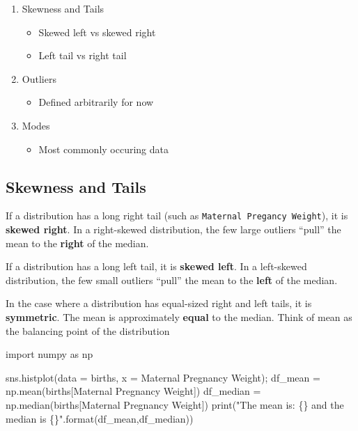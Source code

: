 \documentclass[
  letterpaper,
  DIV=11,
  numbers=noendperiod]{scrreprt}
\newenvironment{Shaded}{\begin{snugshade}}{\end{snugshade}}
\newcommand{\BuiltInTok}[1]{\textcolor[rgb]{0.00,0.23,0.31}{#1}}
\newcommand{\ImportTok}[1]{\textcolor[rgb]{0.00,0.46,0.62}{#1}}
\newcommand{\NormalTok}[1]{\textcolor[rgb]{0.00,0.23,0.31}{#1}}
\newcommand{\OperatorTok}[1]{\textcolor[rgb]{0.37,0.37,0.37}{#1}}
\newcommand{\SpecialCharTok}[1]{\textcolor[rgb]{0.37,0.37,0.37}{#1}}
\newcommand{\StringTok}[1]{\textcolor[rgb]{0.13,0.47,0.30}{#1}}
\providecommand{\tightlist}{%
  \setlength{\itemsep}{0pt}\setlength{\parskip}{0pt}}\usepackage{longtable,booktabs,array}
\begin{document}
\begin{enumerate}
\def\labelenumi{\arabic{enumi}.}
\tightlist
\item
  Skewness and Tails

  \begin{itemize}
  \tightlist
  \item
    Skewed left vs skewed right
  \item
    Left tail vs right tail
  \end{itemize}
\item
  Outliers

  \begin{itemize}
  \tightlist
  \item
    Defined arbitrarily for now
  \end{itemize}
\item
  Modes

  \begin{itemize}
  \tightlist
  \item
    Most commonly occuring data
  \end{itemize}
\end{enumerate}

\hypertarget{skewness-and-tails}{%
\subsection{Skewness and Tails}\label{skewness-and-tails}}

If a distribution has a long right tail (such as
\texttt{Maternal\ Pregancy\ Weight}), it is \textbf{skewed right}. In a
right-skewed distribution, the few large outliers ``pull'' the mean to
the \textbf{right} of the median.

If a distribution has a long left tail, it is \textbf{skewed left}. In a
left-skewed distribution, the few small outliers ``pull'' the mean to
the \textbf{left} of the median.

In the case where a distribution has equal-sized right and left tails,
it is \textbf{symmetric}. The mean is approximately \textbf{equal} to
the median. Think of mean as the balancing point of the distribution

\begin{Shaded}
\begin{Highlighting}[]
\ImportTok{import}\NormalTok{ numpy }\ImportTok{as}\NormalTok{ np}

\NormalTok{sns.histplot(data }\OperatorTok{=}\NormalTok{ births, x }\OperatorTok{=} \StringTok{\textquotesingle{}Maternal Pregnancy Weight\textquotesingle{}}\NormalTok{)}\OperatorTok{;}
\NormalTok{df\_mean }\OperatorTok{=}\NormalTok{ np.mean(births[}\StringTok{\textquotesingle{}Maternal Pregnancy Weight\textquotesingle{}}\NormalTok{])}
\NormalTok{df\_median }\OperatorTok{=}\NormalTok{ np.median(births[}\StringTok{\textquotesingle{}Maternal Pregnancy Weight\textquotesingle{}}\NormalTok{])}
\BuiltInTok{print}\NormalTok{(}\StringTok{"The mean is: }\SpecialCharTok{\{\}}\StringTok{ and the median is }\SpecialCharTok{\{\}}\StringTok{"}\NormalTok{.}\BuiltInTok{format}\NormalTok{(df\_mean,df\_median))}
\end{Highlighting}
\end{Shaded}
\end{document}
